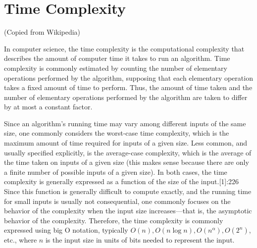 \chapter{Time Complexity}

(Copied from Wikipedia)

In computer science, the time complexity is the computational complexity that describes the amount of computer time it takes to run an algorithm. Time complexity is commonly estimated by counting the number of elementary operations performed by the algorithm, supposing that each elementary operation takes a fixed amount of time to perform. Thus, the amount of time taken and the number of elementary operations performed by the algorithm are taken to differ by at most a constant factor.

Since an algorithm's running time may vary among different inputs of the same size, one commonly considers the worst-case time complexity, which is the maximum amount of time required for inputs of a given size. Less common, and usually specified explicitly, is the average-case complexity, which is the average of the time taken on inputs of a given size (this makes sense because there are only a finite number of possible inputs of a given size). In both cases, the time complexity is generally expressed as a function of the size of the input.[1]:226 Since this function is generally difficult to compute exactly, and the running time for small inputs is usually not consequential, one commonly focuses on the behavior of the complexity when the input size increases—that is, the asymptotic behavior of the complexity. Therefore, the time complexity is commonly expressed using big O notation, typically $O(n), O(n\log n), O(n^{\alpha }), O(2^{n})$, etc., where $n$ is the input size in units of bits needed to represent the input.

